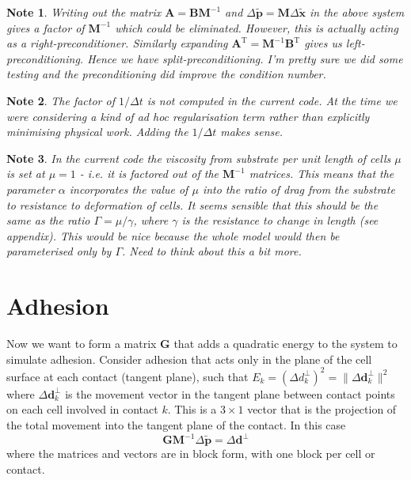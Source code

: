 \documentclass{report}
\renewcommand{\vec}[1]{\mathbf{#1}}
\newcommand{\mat}{\mathbf}
\newcommand{\invmat}[1]{\mat{#1}^{-1}}
\newtheorem*{note}{Note}
\begin{document}
\begin{note}
Writing out the matrix $\mat{A}=\mat{B}\invmat{M}$ and $\Delta \tilde{\vec{p}} =
\mat{M}\Delta \tilde{\vec{x}}$ in the above system gives a
factor of $\invmat{M}$ which could be eliminated. However, this is actually
acting as a right-preconditioner. Similarly expanding
$\mat{A}^\textrm{T}=\invmat{M}\mat{B}^\textrm{T}$ gives us left-preconditioning.
Hence we have split-preconditioning. 
I'm pretty sure we did some testing and the preconditioning did improve
the condition number.
\end{note}

\begin{note}
The factor of $1/\Delta t$ is not computed in the current code. At the
time we were considering a kind of ad hoc regularisation term rather than
explicitly minimising physical work. Adding the $1/\Delta t$ makes sense. 
\end{note}

\begin{note}
In the current code the viscosity from substrate per unit length of cells $\mu$
is set at $\mu=1$ -
i.e. it is factored out of the $\invmat{M}$ matrices. This means that the
parameter $\alpha$ incorporates the value of $\mu$ into the ratio of drag from the substrate to
resistance to deformation of cells. It seems sensible that this should be the
same as the ratio $\Gamma = \mu/\gamma$, where $\gamma$ is the resistance to
change in length (see appendix). This would be nice because the whole model
would then be parameterised only by $\Gamma$. Need to think about this a bit more.
\end{note}

\section{Adhesion}
Now we want to form a matrix $\mat{G}$ that adds a quadratic energy to the
system to simulate adhesion. Consider adhesion that acts only in the plane of
the cell surface at each contact (tangent plane), such that $E_k = (\Delta
d^{\perp}_k)^2 = \|\Delta \vec{d}^\perp_k\|^2$ where $\Delta \vec{d}^\perp_k$ is
the movement vector in the tangent plane
between contact points on each cell involved in contact $k$. This is a
$3\times1$ vector that is the projection of the total movement into the tangent plane of
the contact. In this case
\begin{equation*}
\mat{G}\invmat{M}\Delta \tilde{\vec{p}} = \Delta \vec{d}^\perp
\end{equation*}
where the matrices and vectors are in block form, with one block per cell or
contact.
\end{document}
